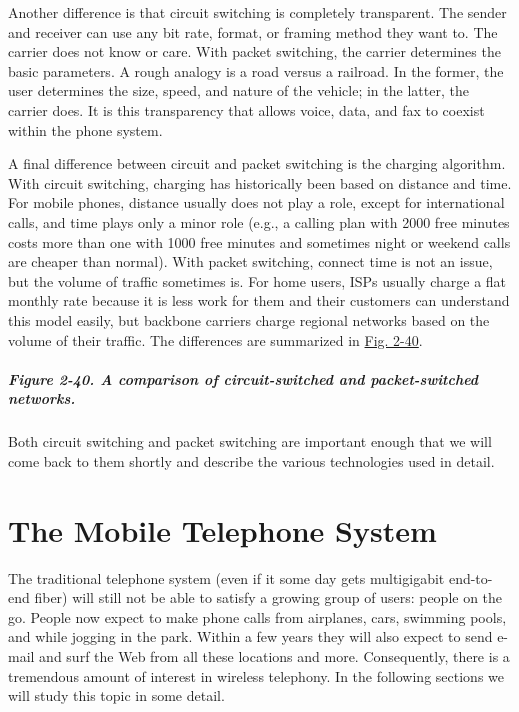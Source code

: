 Another difference is that circuit switching is completely transparent.
The sender and receiver can use any bit rate, format, or framing method
they want to. The carrier does not know or care. With packet switching,
the carrier determines the basic parameters. A rough analogy is a road
versus a railroad. In the former, the user determines the size, speed,
and nature of the vehicle; in the latter, the carrier does. It is this
transparency that allows voice, data, and fax to coexist within the
phone system.

A final difference between circuit and packet switching is the charging
algorithm. With circuit switching, charging has historically been based
on distance and time. For mobile phones, distance usually does not play
a role, except for international calls, and time plays only a minor role
(e.g., a calling plan with 2000 free minutes costs more than one with
1000 free minutes and sometimes night or weekend calls are cheaper than
normal). With packet switching, connect time is not an issue, but the
volume of traffic sometimes is. For home users, ISPs usually charge a
flat monthly rate because it is less work for them and their customers
can understand this model easily, but backbone carriers charge regional
networks based on the volume of their traffic. The differences are
summarized in
\protect\hyperlink{0130661023_ch02lev1sec5.htmlux5cux23ch02fig40}{Fig.
2-40}.

\subparagraph[Figure 2-40. A comparison of circuit-switched and
packet-switched
networks.]{\texorpdfstring{\protect\hypertarget{0130661023_ch02lev1sec5.htmlux5cux23ch02fig40}{}{}Figure
2-40. A comparison of circuit-switched and packet-switched
networks.}{Figure 2-40. A comparison of circuit-switched and packet-switched networks.}}


Both circuit switching and packet switching are important enough that we
will come back to them shortly and describe the various technologies
used in detail.

\section{The Mobile Telephone System}

The traditional telephone system (even if it some day gets multigigabit
end-to-end fiber) will still not be able to satisfy a growing group of
users: people on the go. People now expect to make phone calls from
airplanes, cars, swimming pools, and while jogging in the park. Within a
few years they will also expect to send e-mail and surf the Web from all
these locations and more. Consequently, there is a tremendous amount of
interest in wireless telephony. In the following sections we will study
this topic in some detail.

